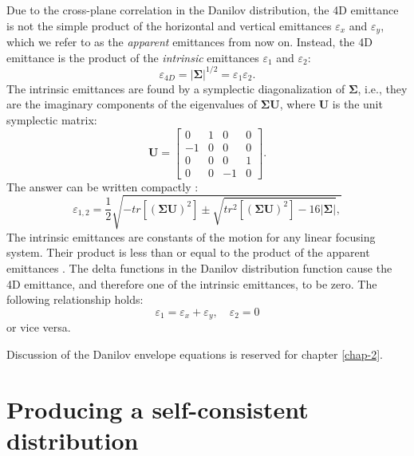 Due to the cross-plane correlation in the Danilov distribution, the 4D emittance is not the simple product of the horizontal and vertical emittances $\varepsilon_x$ and $\varepsilon_y$, which we refer to as the \textit{apparent} emittances from now on. Instead, the 4D emittance is the product of the \textit{intrinsic} emittances $\varepsilon_1$ and $\varepsilon_2$:
%
\begin{equation} \label{eq:mode_emittances1}
    \varepsilon_{4D} = \left|{\bm{\Sigma}}\right|^{1/2} = \varepsilon_1\varepsilon_2.
\end{equation}
%
The intrinsic emittances are found by a symplectic diagonalization of $\bm{\Sigma}$, i.e., they are the imaginary components of the eigenvalues of $\bm{\Sigma}\mathbf{U}$, where $\mathbf{U}$ is the unit symplectic matrix:
%
\begin{equation}
    \mathbf{U} = 
    \begin{bmatrix}
        0 & 1 & 0 & 0 \\
        -1 & 0 & 0 & 0 \\
        0 & 0 & 0 & 1 \\
        0 & 0 & -1 & 0
    \end{bmatrix}.
\end{equation}
%
The answer can be written compactly \cite{Xiao2013}:
%
\begin{equation}
    \varepsilon_{1, 2} = \frac{1}{2}\sqrt{
      -tr\left[(\bm{\Sigma} \mathbf{U})^2\right] \pm \sqrt{tr^2\left[(\bm{\Sigma} \mathbf{U})^2\right] - 16|{\bm{\Sigma}}|},
    }
\end{equation}
%
The intrinsic emittances are constants of the motion for any linear focusing system. Their product is less than or equal to the product of the apparent emittances \cite{Buon1993}. The delta functions in the Danilov distribution function cause the 4D emittance, and therefore one of the intrinsic emittances, to be zero. The following relationship holds:
%
\begin{equation} \label{eq:mode_emittances2}
    \varepsilon_1 = \varepsilon_x + \varepsilon_y, \quad
    \varepsilon_2 = 0
\end{equation}
%
or vice versa. 

Discussion of the Danilov envelope equations is reserved for chapter \ref{chap-2}.




\section{Producing a self-consistent distribution}\label{sec:Producing a self-consistent distribution}


